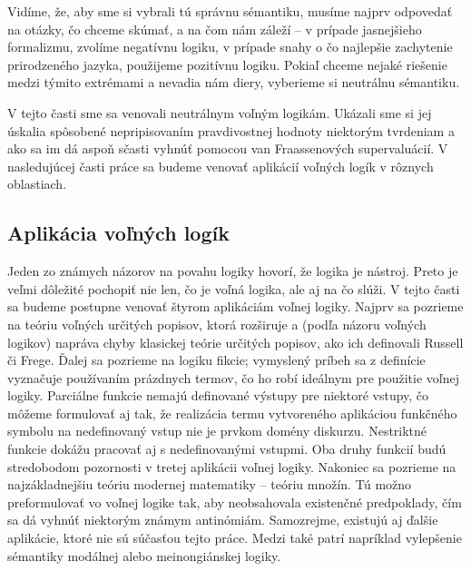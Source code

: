 \documentclass[12pt, letterpaper]{article}
\begin{document}
Vidíme, že, aby sme si vybrali tú správnu sémantiku, musíme najprv odpovedať na otázky, čo chceme skúmať, a na čom nám záleží -- v prípade jasnejšieho formalizmu, zvolíme negatívnu logiku, v prípade snahy o čo najlepšie zachytenie prirodzeného jazyka, použijeme pozitívnu logiku. Pokiaľ chceme nejaké riešenie medzi týmito extrémami a nevadia nám diery, vyberieme si neutrálnu sémantiku.\par
V tejto časti sme sa venovali neutrálnym voľným logikám. Ukázali sme si jej úskalia spôsobené nepripisovaním pravdivostnej hodnoty niektorým tvrdeniam a ako sa im dá aspoň sčasti vyhnúť pomocou van Fraassenových supervaluácií. V nasledujúcej časti práce sa budeme venovať aplikácií voľných logík v rôznych oblastiach.







\subsection{Aplikácia voľných logík}

Jeden zo známych názorov na povahu logiky hovorí, že logika je nástroj. Preto je veľmi dôležité pochopiť nie len, čo je voľná logika, ale aj na čo slúži. V tejto časti sa budeme postupne venovať štyrom aplikáciám voľnej logiky. Najprv sa pozrieme na teóriu voľných určitých popisov, ktorá rozširuje a (podľa názoru voľných logikov) napráva chyby klasickej teórie určitých popisov, ako ich definovali Russell či Frege. Ďalej sa pozrieme na logiku fikcie; vymyslený príbeh sa z definície vyznačuje používaním prázdnych termov, čo ho robí ideálnym pre použitie voľnej logiky. Parciálne funkcie nemajú definované výstupy pre niektoré vstupy, čo môžeme formulovať aj tak, že realizácia termu vytvoreného aplikáciou funkčného symbolu na nedefinovaný vstup nie je prvkom domény diskurzu. Nestriktné funkcie dokážu pracovať aj s nedefinovanými vstupmi. Oba druhy funkcií budú stredobodom pozornosti v tretej aplikácii voľnej logiky. Nakoniec sa pozrieme na najzákladnejšiu teóriu modernej matematiky -- teóriu množín. Tú možno preformulovať vo voľnej logike tak, aby neobsahovala existenčné predpoklady, čím sa dá vyhnúť niektorým známym antinómiám. Samozrejme, existujú aj ďalšie aplikácie, ktoré nie sú súčasťou tejto práce. Medzi také patrí napríklad vylepšenie sémantiky modálnej alebo meinongiánskej logiky.
 
\end{document}

